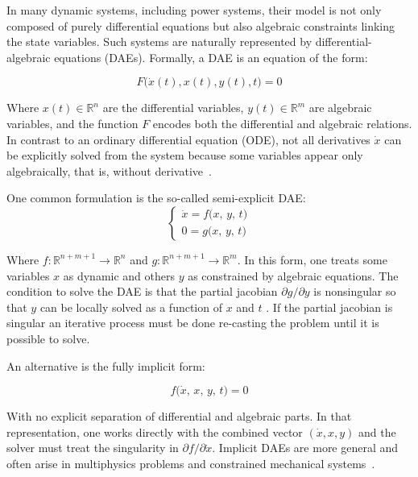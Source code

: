 In many dynamic systems, including power systems, their model is not only composed of purely differential equations but also algebraic constraints linking the state
variables. Such systems are naturally represented by differential-algebraic equations (DAEs). Formally, a DAE is an equation of the form: 

\begin{equation}
  F\bigl(\dot{x}(t), x(t), y(t), t\bigr) = 0
\end{equation}


Where $x(t)\in \mathbb{R}^n$ are the differential variables, $y(t)\in \mathbb{R}^m$ are algebraic variables, and the function
 $F$ encodes both the differential and algebraic relations. 
In contrast to an ordinary differential equation (ODE), not all derivatives $\dot{x}$ can be explicitly solved from the system because some variables appear only 
algebraically, that is, without derivative~\cite{CasellaDAE}.

One common formulation is the so-called semi-explicit DAE:  
\begin{equation}
\begin{cases}
\dot x = f\bigl(x,\,y,\,t\bigr) \\
0 = g\bigl(x,\,y,\,t\bigr)
\end{cases}
\end{equation} 

Where $f\colon \mathbb{R}^{n+m+1} \to \mathbb{R}^n$ and $g\colon \mathbb{R}^{n+m+1} \to \mathbb{R}^m$. In this form, one treats some variables $x$ as dynamic and others $y$
as constrained by algebraic equations. The condition to solve the DAE is that the partial jacobian $\partial g / \partial y$ is nonsingular so that $y$ can be locally solved as
a function of $x$ and $t$ \cite{CasellaDAE}. If the partial jacobian is singular an iterative process must be done re-casting the problem until it is possible to solve.  

An alternative is the fully implicit form:  

\begin{equation}
f\bigl(\dot{x},\, x,\, y,\, t \bigr) = 0
\end{equation}

With no explicit separation of differential and algebraic parts. In that representation, one works directly with the combined vector $(\dot{x}, x, y)$ and the solver must treat 
the singularity in $\partial f / \partial \dot{x}$. Implicit DAEs are more general and often arise in multiphysics problems and constrained mechanical systems~\cite{CasellaDAE}.  

